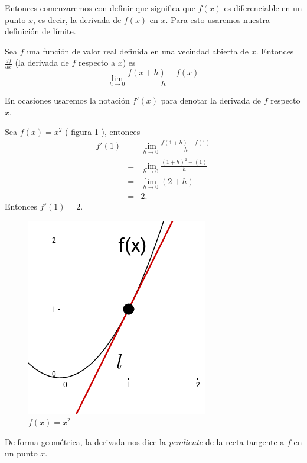 Entonces comenzaremos con definir que significa que $f(x)$ es diferenciable en un punto $x$, es decir, la derivada de $f(x)$ en $x$. Para esto usaremos
nuestra definición de límite.

\begin{definition}
    Sea $f$ una función de valor real definida en una vecindad abierta de $x$. Entonces $\frac{df}{dx}$ (la derivada de $f$ respecto a $x$) es
    $$ \lim_{h \rightarrow 0} \frac{f(x+h) - f(x)}{h} $$
\end{definition}

En ocasiones usaremos la notación $f'(x)$ para denotar la derivada de $f$ respecto $x$.

\begin{example}
    Sea $f(x)=x^{2}$ ( figura \ref{fig:derivative} ), entonces
    \begin{eqnarray*}
        f'(1) &=& \lim_{h \rightarrow 0} \frac{f(1+h)-f(1)}{h} \\
              &=& \lim_{h \rightarrow 0} \frac{(1+h)^{2}-(1)}{h} \\
              &=& \lim_{h \rightarrow 0} (2 + h) \\
              &=& 2 \text{.}
    \end{eqnarray*}
    Entonces $f'(1) = 2$.
\end{example}

\begin{figure}[!ht]
  \begin{center}
      \includegraphics[width=0.5\linewidth]{gfx/derivative-example}
      \caption{$f(x)=x^{2}$}
      \label{fig:derivative}
  \end{center}
\end{figure}

De forma geométrica, la derivada nos dice la \emph{pendiente} de la recta tangente a $f$ en un punto $x$.

